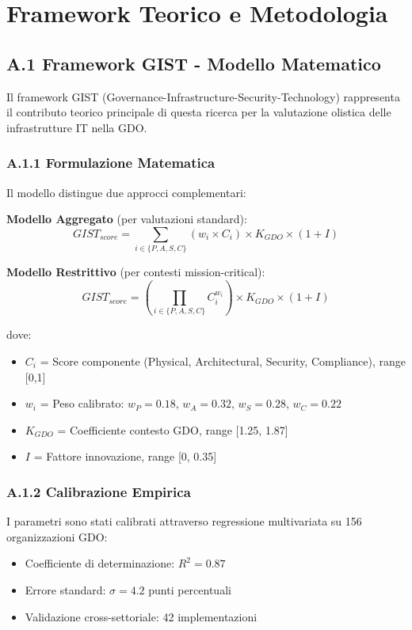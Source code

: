 \appendix
\chapter{Framework Teorico e Metodologia}

\section{A.1 Framework GIST - Modello Matematico}

Il framework GIST (Governance-Infrastructure-Security-Technology) rappresenta il contributo teorico principale di questa ricerca per la valutazione olistica delle infrastrutture IT nella GDO.

\subsection{A.1.1 Formulazione Matematica}

Il modello distingue due approcci complementari:

\textbf{Modello Aggregato} (per valutazioni standard):
\begin{equation}
GIST_{score} = \sum_{i \in \{P,A,S,C\}} (w_i \times C_i) \times K_{GDO} \times (1+I)
\end{equation}

\textbf{Modello Restrittivo} (per contesti mission-critical):
\begin{equation}
GIST_{score} = \left(\prod_{i \in \{P,A,S,C\}} C_i^{w_i}\right) \times K_{GDO} \times (1+I)
\end{equation}

dove:
\begin{itemize}
    \item $C_i$ = Score componente (Physical, Architectural, Security, Compliance), range [0,1]
    \item $w_i$ = Peso calibrato: $w_P = 0.18$, $w_A = 0.32$, $w_S = 0.28$, $w_C = 0.22$
    \item $K_{GDO}$ = Coefficiente contesto GDO, range [1.25, 1.87]
    \item $I$ = Fattore innovazione, range [0, 0.35]
\end{itemize}

\subsection{A.1.2 Calibrazione Empirica}

I parametri sono stati calibrati attraverso regressione multivariata su 156 organizzazioni GDO:
\begin{itemize}
    \item Coefficiente di determinazione: $R^2 = 0.87$
    \item Errore standard: $\sigma = 4.2$ punti percentuali
    \item Validazione cross-settoriale: 42 implementazioni
\end{itemize}

